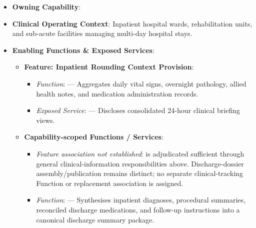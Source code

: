 \begin{itemize}

\item
\textbf{Owning Capability}: \texttt{}



\item
\textbf{Clinical Operating Context}: Inpatient hospital wards, rehabilitation units, and sub-acute facilities managing multi-day hospital stays.



\item
\textbf{Enabling Functions \& Exposed Services}:


\begin{itemize}

\item
\textbf{Feature: Inpatient Rounding Context Provision}:


\begin{itemize}

\item
\emph{Function}: \texttt{} — Aggregates daily vital signs, overnight pathology, allied health notes, and medication administration records.



\item
\emph{Exposed Service}: \texttt{} — Discloses consolidated 24-hour clinical briefing views.



\end{itemize}


\item
\textbf{Capability-scoped Functions /\allowbreak{} Services}:


\begin{itemize}

\item
\emph{Feature association not established}: \texttt{} is adjudicated sufficient through general clinical-information responsibilities above. Discharge-dossier assembly/\allowbreak{}publication remains distinct; no separate clinical-tracking Function or replacement association is assigned.



\item
\emph{Function}: \texttt{} — Synthesises inpatient diagnoses, procedural summaries, reconciled discharge medications, and follow-up instructions into a canonical discharge summary package.




\end{itemize}
\end{itemize}
\end{itemize}
